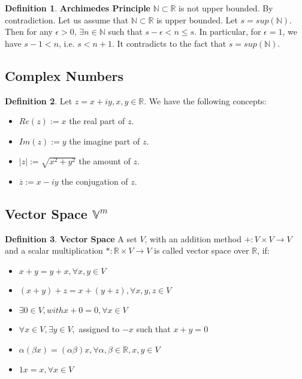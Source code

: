 \documentclass{article}
\theoremstyle{definition}
\newtheorem{defi}{Definition}[subsection]
\begin{document}
\begin{defi}
\textbf{Archimedes Principle} $\mathbb{N}\subset \mathbb{R}$ is not upper bounded.
By contradiction. Let us assume that $\mathbb{N}\subset \mathbb{R}$ is upper bounded. Let $s=sup(\mathbb{N})$. Then for any $\epsilon>0$, $\exists n\in \mathbb{N}$ such that $s-\epsilon<n\leq s$. In particular, for $\epsilon=1$, we have $s-1<n$, i.e. $s<n+1$. It contradicts to the fact that $s=sup(\mathbb{N})$.
\end{defi}

\subsection{Complex Numbers}

\begin{defi}
Let $z=x+iy, x,y\in \mathbb{R}$. We have the following concepts:

\begin{itemize}
    \item $Re(z) := x$ the real part of $z$.
    \item $Im(z) := y$ the imagine part of $z$.
    \item $|z| := \sqrt{x^2+y^2}$ the amount of $z$.
    \item $\overline{z} := x-iy$ the conjugation of $z$. 
\end{itemize}

\end{defi}

\subsection{Vector Space $\mathbb{V}^{m}$}

\begin{defi}
\textbf{Vector Space} A set $V$, with an addition method $+: V\times V \to V$ and a scalar multiplication $\ast: \mathbb{R}\times V \to V$ is called vector space over $\mathbb{R}$, if:

\begin{itemize}
    \item $x+y = y + x, \forall x,y\in V$
    \item $(x+y)+z = x + (y+z), \forall x,y,z \in V$
    \item $\exists 0\in V, with x+0=0, \forall x\in V$
    \item $\forall x\in V, \exists y\in V,$ assigned to $-x$ such that $x+y = 0$
    \item $\alpha (\beta x) = (\alpha \beta)x, \forall \alpha,\beta \in \mathbb{R}, x, y \in V$
    \item $1x = x, \forall x \in V$
\end{itemize}
\end{defi}
\end{document}
